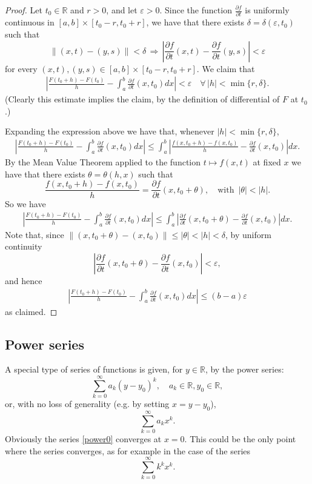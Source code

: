 \documentclass[a4paper,reqno]{amsart}
\numberwithin{equation}{section}
\def\R{\mathbb{R}}
\begin{document}
\begin{proof}
Let $t_0\in \R$ and $r>0$, and let $\varepsilon>0$. Since the function $\frac{\partial f}{\partial t}$ is uniformly continuous in $[a,b]\times [t_0-r, t_0+r]$, we have that there exists $\delta=\delta(\varepsilon,t_0)$ such that
$$
\|(x,t)-(y,s)\|<\delta \, \Rightarrow \, \left|\frac{\partial f}{\partial t}(x,t)-\frac{\partial f}{\partial t}(y,s)\right|<\varepsilon
$$
for every $(x,t),(y,s) \in [a,b]\times [t_0-r, t_0+r]$. We claim that
\begin{align*}
\left|\frac{F(t_0+h) - F(t_0)}{h} - \int_a^b \frac{\partial f}{\partial t}(x,t_0) dx \right|<\varepsilon \quad \forall \, |h|<\min\{r,\delta\}.
\end{align*}
(Clearly this estimate implies the claim, by the definition of differential of $F$ at $t_0$.)

Expanding the expression above we have that, whenever $|h|<\min\{r,\delta\}$,
\begin{align*}
\left|\frac{F(t_0+h) - F(t_0)}{h} - \int_a^b \frac{\partial f}{\partial t}(x,t_0) dx\right| \leq
\int_a^b \left| \frac{f(x,t_0+h) - f(x,t_0)}{h} - \frac{\partial f}{\partial t}(x,t_0) \right| dx.
\end{align*}
By the Mean Value Theorem applied to the function $t\mapsto f(x,t)$ at fixed $x$ we have that there exists $\theta = \theta(h,x)$ such that
$$
\frac{f(x,t_0+h) - f(x,t_0)}{h} =  \frac{\partial f}{\partial t}(x,t_0+\theta), \quad \textrm{with }\, |\theta|<|h|.
$$
So we have
\begin{align*}
\left|\frac{F(t_0+h) - F(t_0)}{h} - \int_a^b \frac{\partial f}{\partial t}(x,t_0) dx\right| \leq
\int_a^b \left| \frac{\partial f}{\partial t}(x,t_0+\theta)- \frac{\partial f}{\partial t}(x,t_0) \right| dx.
\end{align*}
Note that, since $\|(x,t_0+\theta) - (x,t_0)\|\leq |\theta|<|h|<\delta$, by uniform continuity
$$
\left| \frac{\partial f}{\partial t}(x,t_0+\theta)- \frac{\partial f}{\partial t}(x,t_0) \right| <\varepsilon,
$$
and hence
\begin{align*}
\left|\frac{F(t_0+h) - F(t_0)}{h} - \int_a^b \frac{\partial f}{\partial t}(x,t_0) dx\right| \leq (b-a)\varepsilon
\end{align*}
as claimed.
\end{proof}


\subsection{Power series}
A special type of series of functions is given, for $y\in \R$, by the power series:
\begin{equation}\label{powerx0}
\sum_{k=0}^\infty a_k(y-y_0)^k, \quad a_k \in \R, y_0\in \R,
\end{equation}
or, with no loss of generality (e.g. by setting $x=y-y_0$),
\begin{equation}\label{power0}
\sum_{k=0}^\infty a_k x^k.
\end{equation}
Obviously the series \eqref{power0} converges at $x=0$. This could be the only point where the series converges, as for example in the case of the series
$$
\sum_{k=0}^\infty k^k x^k.
$$
\end{document}
